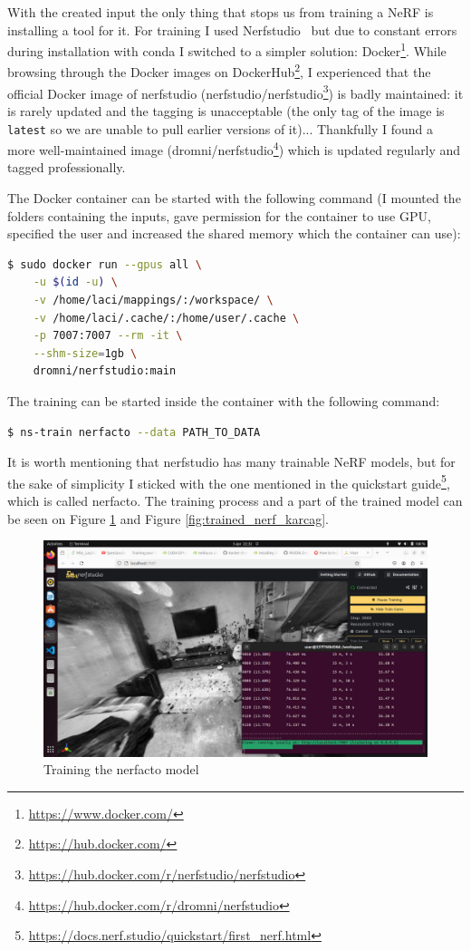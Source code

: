 With the created input the only thing that stops us from training a NeRF is installing a tool for it. For training I used Nerfstudio~\cite{nerfstudio} but due to constant errors during installation with conda I switched to a simpler solution: Docker\footnote{\url{https://www.docker.com/}}. While browsing through the Docker images on DockerHub\footnote{\url{https://hub.docker.com/}}, I experienced that the official Docker image of nerfstudio (nerfstudio/nerfstudio\footnote{\url{https://hub.docker.com/r/nerfstudio/nerfstudio}}) is badly maintained: it is rarely updated and the tagging is unacceptable (the only tag of the image is \verb|latest| so we are unable to pull earlier versions of it)... Thankfully I found a more well-maintained image (dromni/nerfstudio\footnote{\url{https://hub.docker.com/r/dromni/nerfstudio}}) which is updated regularly and tagged professionally.

The Docker container can be started with the following command (I mounted the folders containing the inputs, gave permission for the container to use GPU, specified the user and increased the shared memory which the container can use):

\FloatBarrier
\begin{lstlisting}[language=bash,frame=single,float=!ht]
$ sudo docker run --gpus all \
    -u $(id -u) \
    -v /home/laci/mappings/:/workspace/ \
    -v /home/laci/.cache/:/home/user/.cache \
    -p 7007:7007 --rm -it \
    --shm-size=1gb \
    dromni/nerfstudio:main
\end{lstlisting}

The training can be started inside the container with the following command:
\FloatBarrier
\begin{lstlisting}[language=bash,frame=single,float=!ht]
$ ns-train nerfacto --data PATH_TO_DATA
\end{lstlisting}
It is worth mentioning that nerfstudio has many trainable NeRF models, but for the sake of simplicity I sticked with the one mentioned in the quickstart guide\footnote{\url{https://docs.nerf.studio/quickstart/first_nerf.html}}, which is called nerfacto. The training process and a part of the trained model can be seen on Figure \ref{fig:training_nerf_karcag} and Figure \ref{fig:trained_nerf_karcag}.

\begin{figure}[htbp]
	\centering
	\includegraphics[width=150mm, keepaspectratio]{figures/nerfstudio.png}
	\caption{Training the nerfacto model}
	\label{fig:training_nerf_karcag}
\end{figure}

